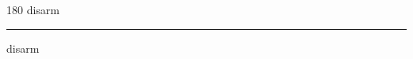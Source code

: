 
\begin{frame}
\begin{center}
\begin{turn}{180}
{\fontsize{2.5cm}{1em}\selectfont disarm}
\end{turn}
\vspace{1em}\par  
\hrule
\vspace{1em}\par  
{\fontsize{2.5cm}{1em}\selectfont disarm}
\end{center}
\end{frame}

